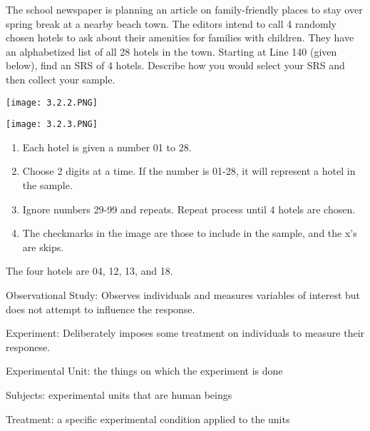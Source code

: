 \documentclass[../stats.tex]{subfiles}
\begin{document}
\begin{example}
    The school newspaper is planning an article on family-friendly places to stay over spring break at a nearby beach town. The editors intend to call 4 randomly chosen hotels to ask about their amenities for families with children. They have an alphabetized list of all 28 hotels in the town.
    Starting at Line 140 (given below), find an SRS of 4 hotels. Describe how you would select your SRS and then collect your sample.
    \begin{center}
        \texttt{[image: 3.2.2.PNG]}
    \end{center}
    \begin{center}
        \texttt{[image: 3.2.3.PNG]}
    \end{center}
    \begin{enumerate}
        \item Each hotel is given a number 01 to 28.
        \item Choose 2 digits at a time. If the number is 01-28, it will represent a hotel in the sample.
        \item Ignore numbers 29-99 and repeats. Repeat process until 4 hotels are chosen.
        \item The checkmarks in the image are those to include in the sample, and the x's are skips.
    \end{enumerate}

    The four hotels are 04, 12, 13, and 18.
\end{example}

Observational Study: Observes individuals and measures variables of interest but does not attempt to influence the response.

Experiment: Deliberately imposes some treatment on individuals to measure their responese.

Experimental Unit: the things on which the experiment is done 

Subjects: experimental units that are human beings 

Treatment: a specific experimental condition applied to the units 
\end{document}

